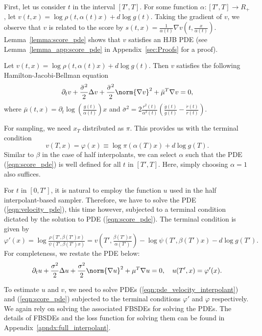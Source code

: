 First, let us consider $t$ in the interval $[T',T]$. For some function $\alpha:[T',T]\rightarrow R_+$, let $v(t,x) = \log\rho(t,\alpha(t)x)+d\log g(t)$. Taking the gradient of $v$, we observe that $v$ is related to the score by $s(t,x )=\frac{1}{\alpha(t)}\nabla v(t,\frac{x}{\alpha(t)})$. Lemma~\ref{lemma:score_pde} shows that $v$ satisfies an HJB PDE (see Lemma~\ref{lemma_app:score_pde} in Appendix~\ref{sec:Proofs} for a proof).
\begin{lemma}\label{lemma:score_pde}
    Let $v(t,x) = \log\rho(t,\alpha(t)x)+d\log g(t)$. Then $v$ satisfies the following Hamilton-Jacobi-Bellman equation
\begin{equation}\label{eqn:score_pde}
    \partial_t v+\frac{\bar{\sigma}^2}{2}\Delta v+\frac{\bar{\sigma}^2}{2}\norm{\nabla v}^2+\bar{\mu}^T\nabla v=0,
\end{equation}
where $\bar{\mu}(t,x) = \partial_t\log\left({\frac{g(t)}{\alpha(t)}}\right)x$ and $\bar{\sigma}^2 = 2\frac{r^2(t)}{\alpha^2(t)}\left(\frac{\dot g(t)}{g(t)}-\frac{\dot r(t)}{r(t)}\right)$.
\end{lemma}

For sampling, we need $x_T$ distributed as $\pi$. This provides us with the terminal condition
\begin{equation}\label{eqn:score_term_condition}
 v(T,x) = \varphi(x)\equiv \log\pi(\alpha(T)x)+d\log g(T).   
\end{equation}
 Similar to $\beta$ in the case of half interpolants, we can select $\alpha$ such that the PDE (\ref{eqn:score_pde}) is well defined for all $t$ in $[T',T]$. Here, simply choosing $\alpha = 1$ also suffices.

 For $t$ in $[0,T']$, it is natural to employ the function $u$ used in the half interpolant-based sampler. Therefore, we have to solve the PDE (\ref{eqn:velocity_pde}), this time however, subjected to a terminal condition dictated by the solution to PDE (\ref{eqn:score_pde}). The terminal condition is given by $\varphi'(x)= \log\frac{\rho(T',\beta(T')x)}{\psi(T',\beta(T')x)} =  v\left(T',\frac{\beta(T')x}{\alpha(T')}\right)-\log\psi(T',\beta(T')x)-d\log g(T').$ For completeness, we restate the PDE below:
\begin{equation}\label{eqn:pde_velocity_interpolant}
    \partial_t u + \frac{\sigma^2}{2}\Delta u + \frac{\sigma^2}{2}\norm{\nabla u}^2 + \mu^T\nabla u = 0,\quad u(T',x) = \varphi'(x).
\end{equation}
\iffalse
\begin{equation}
    \varphi'(x)= v\left(T',\frac{\beta(T')x}{\alpha(T')}\right)-\log\psi(T',\beta(T')x)-d\log g(T').
\end{equation}
\fi
To estimate $u$ and $v$, we need to solve PDEs (\ref{eqn:pde_velocity_interpolant}) and (\ref{eqn:score_pde}) subjected to the terminal conditions $\varphi'$ and $\varphi$ respectively. We again rely on solving the associated FBSDEs for solving the PDEs. The details of FBSDEs and the loss function for solving them can be found in Appendix~\ref{apndx:full_interpolant}.


